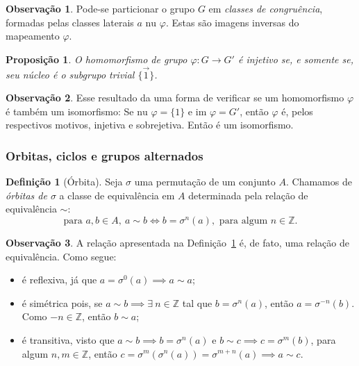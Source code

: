 \documentclass[a4paper,12pt]{report}
\theoremstyle{plain}
\newtheorem{proposicao}{Proposição}[section]
\theoremstyle{definition}
\newtheorem{definicao}{Definição}[section]
\newtheorem{observacao}{Observação}[section]
\begin{document}
\begin{observacao}
	Pode-se particionar o grupo \(G\) em \emph{classes de congruência},
	formadas pelas classes laterais \(a\text{ nu }\varphi\). Estas são imagens
	inversas do mapeamento \(\varphi\).
\end{observacao}

\begin{proposicao}
	O homomorfismo de grupo
	\(\varphi: G\longrightarrow G'\) é injetivo se, e somente se, seu núcleo
	é o subgrupo trivial \(\{\vec 1\}\).
\end{proposicao}

\begin{observacao}
	Esse resultado da uma forma de verificar se um homomorfismo \(\varphi\)
	é também um isomorfismo: Se \(\text{nu }\varphi = \{1\}\) e
	\(\text{im } \varphi = G'\), então \(\varphi\) é, pelos respectivos
	motivos, injetiva e sobrejetiva. Então é um isomorfismo.
\end{observacao}

\subsubsection{Orbitas, ciclos e grupos alternados}

\begin{definicao}[Órbita]\label{def:orbit}
	Seja $\sigma$ uma permutação de um conjunto $A$. Chamamos de \emph{órbitas de $\sigma$} a classe de equivalência em $A$ determinada pela relação de equivalência $\sim$:
	$$\text{para }a,b \in A,\ a\sim b \iff b=\sigma^n(a), \text{ para algum }n\in\mathbb{Z}.$$
\end{definicao}

\begin{observacao}
	A relação apresentada na Definição~\ref{def:orbit} é, de fato, uma relação de equivalência. Como segue:
	\begin{itemize}
		\item é reflexiva, já que $a = \sigma^0(a) \implies a\sim a$;
		\item é simétrica pois, se $a\sim b \implies \exists\  n\in \mathbb{Z}$ tal que $b = \sigma^n(a)$, então $a = \sigma^{-n}(b)$. Como $-n\in\mathbb{Z}$, então $b\sim a$;
		\item é transitiva, visto que $a\sim b \implies b=\sigma^n(a)$ e $b \sim c \implies c = \sigma^m(b)$, para algum $n,m\in\mathbb{Z}$, então $c=\sigma^m(\sigma^n(a)) = \sigma^{m+n}(a) \implies a\sim c$.
	\end{itemize}
\end{observacao}
\end{document}
